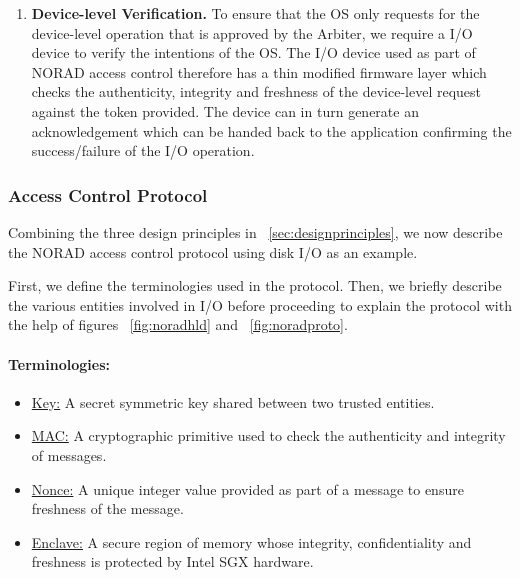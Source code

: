 \documentclass[withindex,glossary]{cam-thesis}
\begin{document}
\begin{enumerate}
\item \textbf{Device-level Verification.}
To ensure that the OS only requests for the device-level operation that is approved by the Arbiter, we require a I/O device to verify the intentions of the OS.
The I/O device used as part of NORAD access control therefore has a thin modified firmware layer which checks the authenticity, integrity and freshness of the device-level request against the token provided.
The device can in turn generate an acknowledgement which can be handed back to the application confirming the success/failure of the I/O operation.

\end{enumerate}

\subsubsection{Access Control Protocol}
Combining the three design principles in ~\ref{sec:designprinciples}, we now describe the NORAD access control protocol using disk I/O as an example.

First, we define the terminologies used in the protocol.
Then, we briefly describe the various entities involved in I/O before proceeding to explain the protocol with the help of figures ~\ref{fig:noradhld} and ~\ref{fig:noradproto}.

\paragraph{Terminologies:}
\begin{itemize}
\item \underline{Key:} A secret symmetric key shared between two trusted entities.
\item \underline{MAC:} A cryptographic primitive used to check the authenticity and integrity of messages.
\item \underline{Nonce:} A unique integer value provided as part of a message to ensure freshness of the message.
\item \underline{Enclave:} A secure region of memory whose integrity, confidentiality and freshness is protected by Intel SGX hardware.
\end{itemize}
\end{document}
